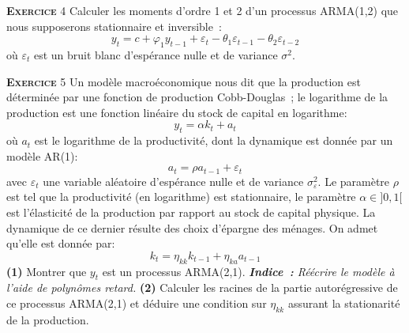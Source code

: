 \documentclass[10pt,a4paper,notitlepage,twocolumn]{article}
\newcommand{\exercice}[1]{\textsc{\textbf{Exercice}} #1}
\newcommand{\question}[1]{\textbf{(#1)}}
\begin{document}
\bigskip

\exercice{4} Calculer les moments d'ordre 1 et 2 d'un processus
ARMA(1,2) que nous supposerons stationnaire et inversible :
\[
y_t = c + \varphi_1 y_{t-1} + \varepsilon_t - \theta_1 \varepsilon_{t-1} - \theta_2 \varepsilon_{t-2}
\]
où $\varepsilon_t$ est un bruit blanc d'espérance nulle et de variance
$\sigma^2$.\newline

\bigskip

\exercice{5} Un modèle macroéconomique nous dit que la production est
déterminée par une fonction de production Cobb-Douglas ; le logarithme
de la production est une fonction linéaire du stock de
capital en logarithme:
\[
y_t = \alpha k_{t} + a_t
\]
où $a_t$ est le logarithme de la productivité, dont la dynamique est
donnée par un modèle AR(1):
\[
a_t = \rho a_{t-1} + \varepsilon_t
\]
avec $\varepsilon_t$ une variable aléatoire d'espérance nulle et de
variance $\sigma_{\varepsilon}^2$. Le paramètre $\rho$ est tel que la
productivité (en logarithme) est stationnaire, le paramètre
$\alpha\in]0,1[$ est l'élasticité de la production par rapport au
stock de capital physique. La dynamique de ce dernier résulte des
choix d'épargne des ménages. On admet qu'elle est donnée par:
\[
k_t = \eta_{kk} k_{t-1} + \eta_{ka}a_{t-1}
\]
\question{1} Montrer que $y_t$ est un processus
ARMA(2,1). \emph{\textbf{Indice :} Réécrire le modèle à l'aide de polynômes retard.} \question{2} Calculer les racines de la partie
autorégressive de ce processus ARMA(2,1) et déduire une condition sur
$\eta_{kk}$ assurant la stationarité de la production.
\end{document}
